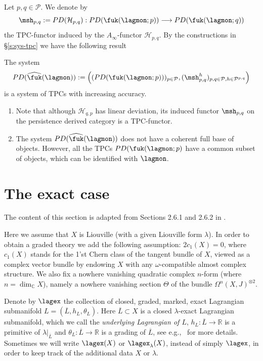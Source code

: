 Let $p,q\in \mathcal{P}$. We denote by $$\msh_{p,q}:= PD(\mathcal{H}_{p,q}): PD(\fuk(\lagmon; p))
\longrightarrow PD(\fuk(\lagmon; q))$$ the TPC-functor induced by the $A_\infty$-functor $\mathcal{H}_{p,q}$. By the constructions in \S\ref{s:sys-tpc} we have the following result
\begin{cor}\label{ffc2}
The system $$PD(\widehat{\fuk}(\lagmon)):=\left((PD(\fuk(\lagmon;p)))_{p\in \mathcal{P}}, (\msh^h_{p,q})_{p,q\in \mathcal{P}, h\in \mathcal{P}^{p,q}}\right)$$ is a system of TPCs with increasing accuracy.
\end{cor}
\begin{remark}
  \begin{enumerate}
    \item Note that although $\mathcal{H}_{q,p}$ has linear deviation, its induced functor $\msh_{p,q}$ on the persistence derived category is a TPC-functor.
    \item The system $PD(\widehat{\fuk}(\lagmon))$ does not have a coherent full base of objects. However, all the TPCs $PD(\fuk(\lagmon;p)$ have a common subset of objects, which can be identified with $\lagmon$.
  \end{enumerate}
\end{remark}



\section{The exact case}\label{sb:fuk-ex} The content of this section is adapted from Sections 2.6.1 and 2.6.2 in \cite{ABC26}.

Here we assume that
$X$ is Liouville (with a given Liouville form $\lambda$). In order to
obtain a graded theory we add the following assumption: $2c_1(X)=0$,
where $c_1(X)$ stands for the 1'st Chern class of the tangent bundle
of $X$, viewed as a complex vector bundle by endowing $X$ with any
$\omega$-compatible almost complex structure.  We also fix a nowhere
vanishing quadratic complex $n$-form (where
$n = \dim_{\mathbb{C}} X$), namely a nowhere vanishing section
$\Theta$ of the bundle $\Omega^n(X, J)^{\otimes 2}$.

Denote by $\lagex$ the collection of closed, graded, marked, exact
Lagrangian submanifold $L = (\overline{L}, h_L, \theta_L)$. Here
$\overline{L} \subset X$ is a closed $\lambda$-exact Lagrangian
submanifold, which we call the {\em underlying Lagrangian of $L$},
$h_L: \overline{L} \longrightarrow \mathbb{R}$ is a primitive of
$\lambda|_{\overline{L}}$ and
$\theta_L: \overline{L} \longrightarrow \mathbb{R}$ is a grading of
$\overline{L}$, see
e.g.\cite{Se:graded},~\cite[Section~3.2.2.2]{BCZ:tpc} for more
details. Sometimes we will write $\lagex(X)$ or $\lagex_{\lambda}(X)$,
instead of simply $\lagex$, in order to keep track of the additional
data $X$ or $\lambda$.


